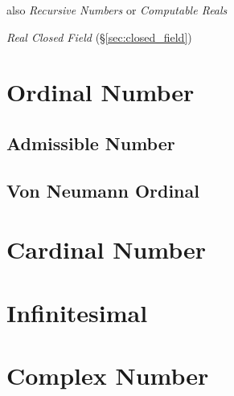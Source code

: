 also \emph{Recursive Numbers} or \emph{Computable Reals}

\emph{Real Closed Field} (\S\ref{sec:closed_field})



\section{Ordinal Number}\label{sec:ordinal_number}

\subsection{Admissible Number}\label{sec:admissible_ordinal}

\subsection{Von Neumann Ordinal}\label{sec:vonneumann_ordinal}



\section{Cardinal Number}\label{sec:cardinal_number}



\section{Infinitesimal}\label{sec:infinitesimal}



\section{Complex Number}\label{sec:complex_number}

